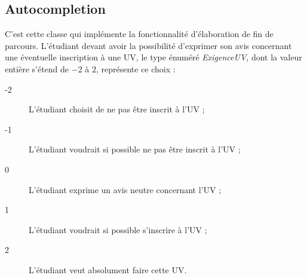 \documentclass[a4paper,10pt,french]{report}
\begin{document}
		\subsubsection{}
			\paragraph{}
			\paragraph{}
			\paragraph{}
		\subsubsection{}
			\paragraph{}
			\paragraph{}
			\paragraph{}	
	\subsection{Autocompletion}\label{subsec:UV}
	
	C'est cette classe qui implémente la fonctionnalité d'élaboration de fin  de parcours.
	L'étudiant devant avoir la possibilité d'exprimer son avis concernant une éventuelle inscription à une UV, le type énuméré \emph{ExigenceUV}, dont la valeur entière s'étend de $-2$ à $2$, représente ce choix : 
	\begin{description}
	\item[-2] L'étudiant choisit de ne pas être inscrit à l'UV ;
	\item[-1] L'étudiant voudrait si possible ne pas être inscrit à l'UV ;	
	\item[0] L'étudiant exprime un avis neutre concernant l'UV ;
	\item[1] L'étudiant voudrait si possible s'inscrire à l'UV ;
	\item[2] L'étudiant veut absolument faire cette UV.
	\end{description}
	
\end{document}
